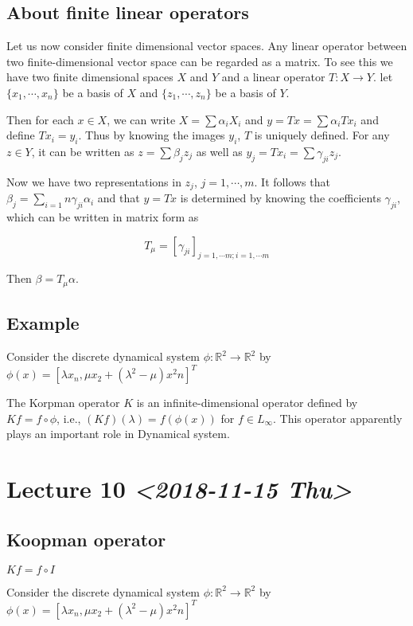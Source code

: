 \documentclass[11pt]{article}
\def\R{\mathbb{R}}
\begin{document}
\subsection{About finite linear operators}
\label{sec:org5ba82e5}
Let us now consider finite dimensional vector spaces. Any linear operator
between two finite-dimensional vector space can be regarded as a matrix. To
see this we have two finite dimensional spaces \(X\) and \(Y\) and a linear
operator \(T \colon X \rightarrow Y\). let \(\{x_1, \cdots, x_n\}\) be a basis of
\(X\) and \(\{z_1, \cdots, z_n\}\) be a basis of \(Y\). 

Then for each \(x\in X\), we can write \(X = \sum \alpha_i X_i\) and \(y = Tx =
   \sum \alpha_i Tx_i\) and define \(Tx_i = y_i\). Thus by knowing the images
\(y_i\), \(T\) is uniquely defined. For any \(z \in Y\), it can be written as \(z =
   \sum \beta_j z_j\) as well as \(y_j = Tx_i = \sum \gamma_{ji}z_j\).

Now we have two representations in \(z_j\), \(j = 1, \cdots, m\). It follows that
\(\beta_j = \sum_{i=1}{n} \gamma_{ji} \alpha_i\) and that \(y = Tx\) is
determined by knowing the coefficients \(\gamma_{ji}\), which can be written in
matrix form as

$$T_\mu = [\gamma_{ji}]_{j=1, \cdots m; i =1, \cdots m}$$

Then \(\beta = T_\mu \alpha\).
\subsection{Example}
\label{sec:orgc74c8f3}
Consider the discrete dynamical system \(\phi \colon \R^2 \rightarrow \R^2\) by
\(\phi(x) = [\lambda x_n, \mu x_2 + (\lambda^2 - \mu)x^2n]^T\)

The Korpman operator \(K\) is an infinite-dimensional operator defined by \(Kf =
   f\circ \phi\), i.e., \((Kf)(\lambda) = f(\phi(x))\) for \(f \in L_{\infty}\). This
operator apparently plays an important role in Dynamical system.
\section{Lecture 10 \textit{<2018-11-15 Thu>}}
\label{sec:org3caf6ad}
\subsection{Koopman operator}
\label{sec:org5292286}
\(Kf = f\circ I\)

Consider the discrete dynamical system \(\phi \colon \R^2 \rightarrow \R^2\) by
\(\phi(x) = [\lambda x_n, \mu x_2 + (\lambda^2 - \mu)x^2n]^T\)
\end{document}

